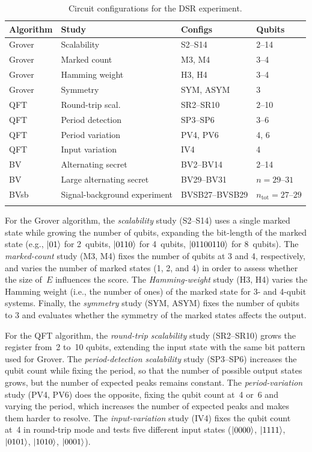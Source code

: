 \documentclass[pdflatex,sn-mathphys-num]{sn-jnl}
\theoremstyle{thmstyleone}%
\theoremstyle{thmstyletwo}%
\theoremstyle{thmstylethree}%
\begin{document}
\begin{table}[!htb]
\caption{Circuit configurations for the DSR experiment.}\label{tab:workloads}%
\begin{tabular}{@{}llll@{}}
\toprule
\textbf{Algorithm} & \textbf{Study} & \textbf{Configs} & \textbf{Qubits} \\
\midrule
Grover & Scalability       & S2--S14      & 2--14 \\
Grover & Marked count      & M3, M4       & 3--4 \\
Grover & Hamming weight    & H3, H4       & 3--4 \\
Grover & Symmetry          & SYM, ASYM    & 3 \\
\midrule
QFT    & Round-trip scal.  & SR2--SR10    & 2--10 \\
QFT    & Period detection  & SP3--SP6     & 3--6 \\
QFT    & Period variation  & PV4, PV6     & 4, 6 \\
QFT    & Input variation   & IV4          & 4 \\
\midrule
BV     & Alternating secret & BV2--BV14  & 2--14 \\
BV     & Large alternating secret & BV29--BV31 & $n=29$--$31$ \\
BVsb & Signal-background experiment & BVSB27--BVSB29 & $n_{\mathrm{tot}}=27$--$29$ \\
\botrule
\end{tabular}
\end{table}

For the Grover algorithm, the \emph{scalability} study (S2--S14) uses a single marked state while growing the number of qubits, expanding the bit-length of the marked state (e.g., $\ket{01}$ for 2~qubits, $\ket{0110}$ for 4~qubits, $\ket{01100110}$ for 8~qubits). The \emph{marked-count} study (M3, M4) fixes the number of qubits at 3 and 4, respectively, and varies the number of marked states (1, 2, and 4) in order to assess whether the size of~$E$ influences the score. The \emph{Hamming-weight} study (H3, H4) varies the Hamming weight (i.e., the number of ones) of the marked state for 3- and 4-qubit systems. Finally, the \emph{symmetry} study (SYM, ASYM) fixes the number of qubits to 3 and evaluates whether the symmetry of the marked states affects the output.

For the QFT algorithm, the \emph{round-trip scalability} study (SR2--SR10) grows the register from~2 to~10 qubits, extending the input state with the same bit pattern used for Grover. The \emph{period-detection scalability} study (SP3--SP6) increases the qubit count while fixing the period, so that the number of possible output states grows, but the number of expected peaks remains constant. The \emph{period-variation} study (PV4, PV6) does the opposite, fixing the qubit count at~4 or~6 and varying the period, which increases the number of expected peaks and makes them harder to resolve. The \emph{input-variation} study (IV4) fixes the qubit count at~4 in round-trip mode and tests five different input states ($\ket{0000}$, $\ket{1111}$, $\ket{0101}$, $\ket{1010}$, $\ket{0001}$).
\end{document}
